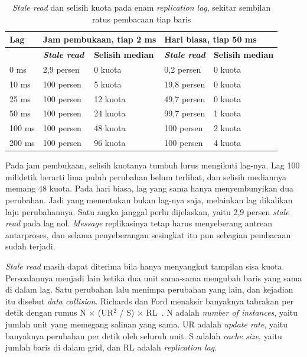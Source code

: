 \begin{table}[htbp]
  \centering
  \caption{\textit{Stale read} dan selisih kuota pada enam \textit{replication lag},
    sekitar sembilan ratus pembacaan tiap baris}
  \label{tab:stale-read}
  \begin{tabularx}{\textwidth}{|l|X|l|X|l|}
    \hline
    \textbf{Lag} & \multicolumn{2}{l|}{\textbf{Jam pembukaan, tiap 2 ms}} & \multicolumn{2}{l|}{\textbf{Hari biasa, tiap 50 ms}} \\
    \hline
    & \textbf{\textit{Stale read}} & \textbf{Selisih median} & \textbf{\textit{Stale read}} & \textbf{Selisih median} \\
    \hline
    0 ms & 2,9 persen & 0 kuota & 0,2 persen & 0 kuota \\
    \hline
    10 ms & 100 persen & 5 kuota & 19,8 persen & 0 kuota \\
    \hline
    25 ms & 100 persen & 12 kuota & 49,7 persen & 0 kuota \\
    \hline
    50 ms & 100 persen & 24 kuota & 99,7 persen & 1 kuota \\
    \hline
    100 ms & 100 persen & 48 kuota & 100 persen & 2 kuota \\
    \hline
    200 ms & 100 persen & 96 kuota & 100 persen & 4 kuota \\
    \hline
  \end{tabularx}
\end{table}

Pada jam pembukaan, selisih kuotanya tumbuh lurus mengikuti lag-nya. Lag 100
milidetik berarti lima puluh perubahan belum terlihat, dan selisih mediannya
memang 48 kuota. Pada hari biasa, lag yang sama hanya menyembunyikan dua
perubahan. Jadi yang menentukan bukan lag-nya saja, melainkan lag dikalikan laju
perubahannya. Satu angka janggal perlu dijelaskan, yaitu 2,9 persen
\textit{stale read} pada lag nol. \textit{Message} replikasinya tetap harus menyeberang
antrean antarproses, dan selama penyeberangan sesingkat itu pun sebagian
pembacaan sudah terjadi.

\textit{Stale read} masih dapat diterima bila hanya menyangkut tampilan sisa
kuota. Persoalannya menjadi lain ketika dua unit sama-sama mengubah baris yang
sama di dalam lag. Satu perubahan lalu menimpa perubahan yang lain, dan
kejadian itu disebut \textit{data
collision}. Richards dan Ford menaksir
banyaknya tabrakan per detik dengan rumus N $\times$ (UR$^2$ / S) $\times$
RL~\cite{richards2020fundamentals}. N adalah \textit{number of instances}, yaitu
jumlah unit yang memegang salinan yang sama. UR adalah \textit{update rate},
yaitu banyaknya perubahan per detik oleh seluruh unit. S adalah \textit{cache
size}, yaitu jumlah baris di dalam grid, dan RL adalah \textit{replication lag}.


